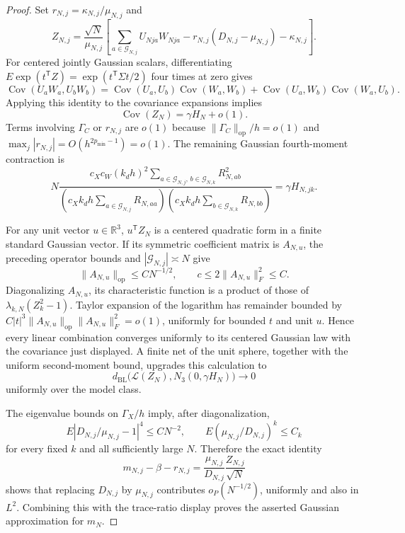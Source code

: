 \documentclass{article}
\begin{document}
\begin{proof}
Set \(r_{N,j}=\kappa_{N,j}/\mu_{N,j}\) and
\[
 Z_{N,j}=\frac{\sqrt N}{\mu_{N,j}}
 \left[\sum_{a\in\mathcal G_{N,j}}U_{Nja}W_{Nja}
       -r_{N,j}(D_{N,j}-\mu_{N,j})-\kappa_{N,j}\right].
\]
For centered jointly Gaussian scalars, differentiating
\(E\exp(t^{\mathsf T}Z)=\exp(t^{\mathsf T}\Sigma t/2)\) four times at zero gives
\[
 \operatorname{Cov}(U_aW_a,U_bW_b)
 =\operatorname{Cov}(U_a,U_b)\operatorname{Cov}(W_a,W_b)
 +\operatorname{Cov}(U_a,W_b)\operatorname{Cov}(W_a,U_b).
\]
Applying this identity to the covariance expansions implies
\[
 \operatorname{Cov}(Z_N)=\gamma H_N+o(1).
\]
Terms involving \(\Gamma_C\) or \(r_{N,j}\) are \(o(1)\) because
\(\|\Gamma_C\|_{\mathrm{op}}/h=o(1)\) and \(\max_j|r_{N,j}|=O(h^{2p_{\min}-1})=o(1)\).  The remaining Gaussian fourth-moment contraction is
\[
 N\frac{c_Xc_W(k_dh)^2
 \sum_{a\in\mathcal G_{N,j},\,b\in\mathcal G_{N,k}}R_{N,ab}^2}
 {(c_Xk_dh\sum_{a\in\mathcal G_{N,j}}R_{N,aa})
  (c_Xk_dh\sum_{b\in\mathcal G_{N,k}}R_{N,bb})}
 =\gamma H_{N,jk}.
\]

For any unit vector \(u\in\mathbb R^3\), \(u^{\mathsf T}Z_N\) is a centered quadratic form in a finite standard Gaussian vector.  If its symmetric coefficient matrix is \(A_{N,u}\), the preceding operator bounds and \(|\mathcal G_{N,j}|\asymp N\) give
\[
 \|A_{N,u}\|_{\mathrm{op}}\le CN^{-1/2},
 \qquad c\le2\|A_{N,u}\|_F^2\le C.
\]
Diagonalizing \(A_{N,u}\), its characteristic function is a product of those of \(\lambda_{k,N}(Z_k^2-1)\).  Taylor expansion of the logarithm has remainder bounded by
\(C|t|^3\|A_{N,u}\|_{\mathrm{op}}\|A_{N,u}\|_F^2=o(1)\), uniformly for bounded \(t\) and unit \(u\).  Hence every linear combination converges uniformly to its centered Gaussian law with the covariance just displayed.  A finite net of the unit sphere, together with the uniform second-moment bound, upgrades this calculation to
\[
 d_{\mathrm{BL}}\bigl(\mathcal L(Z_N),N_3(0,\gamma H_N)\bigr)\longrightarrow0
\]
uniformly over the model class.

The eigenvalue bounds on \(\Gamma_X/h\) imply, after diagonalization,
\[
 E\left|D_{N,j}/\mu_{N,j}-1\right|^4\le CN^{-2},
 \qquad
 E\left(\mu_{N,j}/D_{N,j}\right)^k\le C_k
\]
for every fixed \(k\) and all sufficiently large \(N\).  Therefore the exact identity
\[
 m_{N,j}-\beta-r_{N,j}
 =\frac{\mu_{N,j}}{D_{N,j}}\frac{Z_{N,j}}{\sqrt N}
\]
shows that replacing \(D_{N,j}\) by \(\mu_{N,j}\) contributes \(o_P(N^{-1/2})\), uniformly and also in \(L^2\).  Combining this with the trace-ratio display proves the asserted Gaussian approximation for \(m_N\).


\end{proof}
\end{document}
